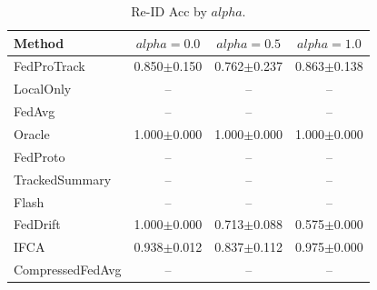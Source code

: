 \begin{table}[t]
\centering
\caption{Re-ID Acc by $alpha$.}
\label{tab:alpha_concept_re_id_accuracy}
\begin{tabular}{lccc}
\toprule
Method & $alpha=0.0$ & $alpha=0.5$ & $alpha=1.0$ \\
\midrule
FedProTrack & 0.850$\pm$0.150 & 0.762$\pm$0.237 & 0.863$\pm$0.138 \\
LocalOnly & -- & -- & -- \\
FedAvg & -- & -- & -- \\
Oracle & 1.000$\pm$0.000 & 1.000$\pm$0.000 & 1.000$\pm$0.000 \\
FedProto & -- & -- & -- \\
TrackedSummary & -- & -- & -- \\
Flash & -- & -- & -- \\
FedDrift & 1.000$\pm$0.000 & 0.713$\pm$0.088 & 0.575$\pm$0.000 \\
IFCA & 0.938$\pm$0.012 & 0.837$\pm$0.112 & 0.975$\pm$0.000 \\
CompressedFedAvg & -- & -- & -- \\
\bottomrule
\end{tabular}
\end{table}